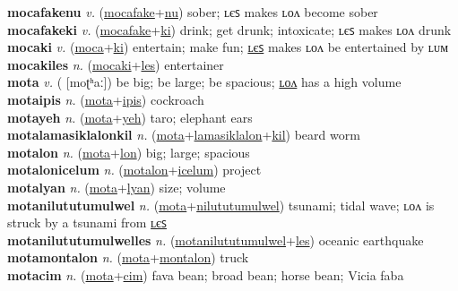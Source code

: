 \textbf{mocafakenu} \textit{v.} (\hyperref[mocafake]{mocafake}+\hyperref[nu]{nu})
sober; ʟєꜱ makes ʟᴏᴧ become sober \label{mocafakenu} \\
\textbf{mocafakeki} \textit{v.} (\hyperref[mocafake]{mocafake}+\hyperref[ki]{ki})
drink; get drunk; intoxicate; ʟєꜱ makes ʟᴏᴧ drunk \label{mocafakeki} \\
\textbf{mocaki} \textit{v.} (\hyperref[moca]{moca}+\hyperref[ki]{ki})
entertain; make fun; \hyperref[mocakiles]{ʟєꜱ} makes ʟᴏᴧ be entertained by ʟᴜᴍ \label{mocaki} \\
\textbf{mocakiles} \textit{n.} (\hyperref[mocaki]{mocaki}+\hyperref[les]{les})
entertainer \label{mocakiles} \\
\textbf{mota} \textit{v.} ( [moʈʰaː])
be big; be large; be spacious; \hyperref[motalon]{ʟᴏᴧ} has a high volume \label{mota} \\
\textbf{motaipis} \textit{n.} (\hyperref[mota]{mota}+\hyperref[ipis]{ipis})
cockroach \label{motaipis} \\
\textbf{motayeh} \textit{n.} (\hyperref[mota]{mota}+\hyperref[yeh]{yeh})
taro; elephant ears \label{motayeh} \\
\textbf{motalamasiklalonkil} \textit{n.} (\hyperref[mota]{mota}+\hyperref[lamasiklalon]{lamasiklalon}+\hyperref[kil]{kil})
beard worm \label{motalamasiklalonkil} \\
\textbf{motalon} \textit{n.} (\hyperref[mota]{mota}+\hyperref[lon]{lon})
big; large; spacious \label{motalon} \\
\textbf{motalonicelum} \textit{n.} (\hyperref[motalon]{motalon}+\hyperref[icelum]{icelum})
project \label{motalonicelum} \\
\textbf{motalyan} \textit{n.} (\hyperref[mota]{mota}+\hyperref[lyan]{lyan})
size; volume \label{motalyan} \\
\textbf{motanilututumulwel} \textit{n.} (\hyperref[mota]{mota}+\hyperref[nilututumulwel]{nilututumulwel})
tsunami; tidal wave; ʟᴏᴧ is struck by a tsunami from \hyperref[motanilututumulwelles]{ʟєꜱ} \label{motanilututumulwel} \\
\textbf{motanilututumulwelles} \textit{n.} (\hyperref[motanilututumulwel]{motanilututumulwel}+\hyperref[les]{les})
oceanic earthquake \label{motanilututumulwelles} \\
\textbf{motamontalon} \textit{n.} (\hyperref[mota]{mota}+\hyperref[montalon]{montalon})
truck \label{motamontalon} \\
\textbf{motacim} \textit{n.} (\hyperref[mota]{mota}+\hyperref[cim]{cim})
fava bean; broad bean; horse bean; Vicia faba \label{motacim} \\
